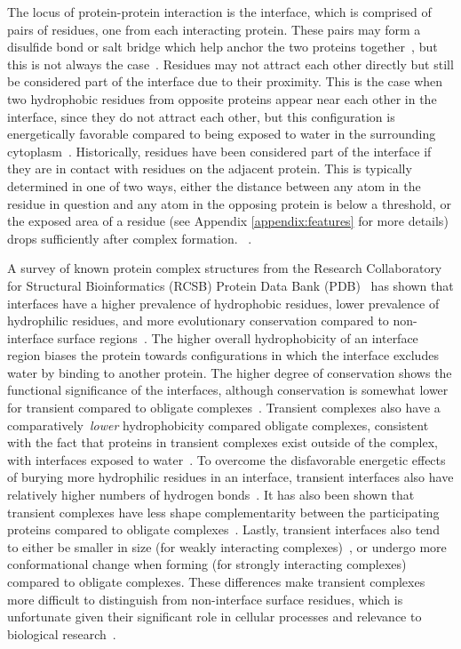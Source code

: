 The locus of protein-protein interaction is the interface, which is comprised of pairs of residues, one from each interacting protein.
These pairs may form a disulfide bond or salt bridge which help anchor the two proteins together~\cite{yan2008}, but this is not always the case~\cite{ofran2003}.
Residues may not attract each other directly but still be considered part of the interface due to their proximity.
This is the case when two hydrophobic residues from opposite proteins appear near each other in the interface, since they do not attract each other, but this configuration is energetically favorable compared to being exposed to water in the surrounding cytoplasm~\cite{yan2008}\cite{ofran2003}.
Historically, residues have been considered part of the interface if they are in contact with residues on the adjacent protein. 
This is typically determined in one of two ways, either the distance between any atom in the residue in question and any atom in the opposing protein is below a threshold, or the exposed area of a residue (see Appendix \ref{appendix:features} for more details) drops sufficiently after complex formation. ~\cite{yan2008}\cite{jones1996}\cite{ofran2003}\cite{minhas2014}.

A survey of known protein complex structures from the Research Collaboratory for Structural Bioinformatics (RCSB) Protein Data Bank (PDB)~\cite{berman2000} has shown that interfaces have a higher prevalence of hydrophobic residues, lower prevalence of hydrophilic residues, and more evolutionary conservation compared to non-interface surface regions~\cite{yan2008}.
The higher overall hydrophobicity of an interface region biases the protein towards configurations in which the interface excludes water by binding to another protein.
The higher degree of conservation shows the functional significance of the interfaces, although conservation is somewhat lower for transient compared to obligate complexes~\cite{jones1996}.
Transient complexes also have a comparatively~\textit{lower} hydrophobicity compared obligate complexes, consistent with the fact that proteins in transient complexes exist outside of the complex, with interfaces exposed to water~\cite{jones1996}.
To overcome the disfavorable energetic effects of burying more hydrophilic residues in an interface, transient interfaces also have relatively higher numbers of hydrogen bonds~\cite{jones1996}.
It has also been shown that transient complexes have less shape complementarity between the participating proteins compared to obligate complexes~\cite{jones1996}.
Lastly, transient interfaces also tend to either be smaller in size (for weakly interacting complexes)~\cite{jones1996}\cite{perkins2010}, or undergo more conformational change when forming (for strongly interacting complexes)~\cite{perkins2010} compared to obligate complexes.
These differences make transient complexes more difficult to distinguish from non-interface surface residues, which is unfortunate given their significant role in cellular processes and relevance to biological research~\cite{perkins2010}.

